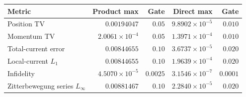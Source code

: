 \begin{tabular}{@{}lrrrr@{}}
\toprule
Metric & Product max & Gate & Direct max & Gate \\
\midrule
Position TV & $0.00194047$ & $0.05$ & $9.8902\times 10^{-5}$ & $0.010$ \\
Momentum TV & $2.0061\times 10^{-4}$ & $0.05$ & $1.3971\times 10^{-4}$ & $0.010$ \\
Total-current error & $0.00844655$ & $0.10$ & $3.6737\times 10^{-5}$ & $0.020$ \\
Local-current $L_1$ & $0.00844655$ & $0.10$ & $1.9639\times 10^{-4}$ & $0.020$ \\
Infidelity & $4.5070\times 10^{-5}$ & $0.0025$ & $3.1546\times 10^{-7}$ & $0.0001$ \\
Zitterbewegung series $L_\infty$ & $0.00881467$ & $0.10$ & $2.2840\times 10^{-5}$ & $0.020$ \\
\bottomrule
\end{tabular}
